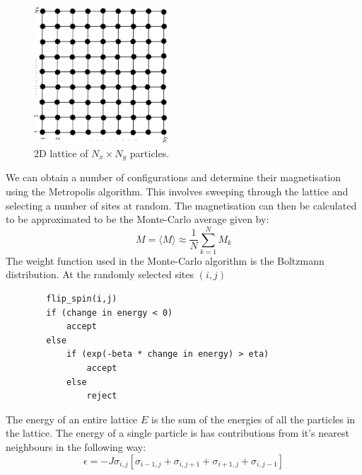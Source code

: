 \documentclass[a4paper]{IEEEtran}
\newcommand{\sg}[2]{\sigma_{#1,#2}}
\newcommand{\av}[1]{\langle #1 \rangle}
\begin{document}
    \begin{figure}[t]
        \caption{2D lattice of $N_x \times N_y$ particles. }
        \label{fig:grid}
        \begin{center}
            \includegraphics[angle=-90,width=5cm]{lattice.eps}
        \end{center}
    \end{figure} 
    
    We can obtain a number of configurations and determine their magnetisation
    using the Metropolis algorithm. This involves sweeping through the lattice
    and selecting a number of sites at random. The magnetisation can then
    be calculated to be approximated to be the Monte-Carlo average given
    by:
    \[ M = \av{M} \approx \frac{1}{N} \sum^{N}_{k=1} M_k \]
    The weight function used in the Monte-Carlo algorithm is the Boltzmann
    distribution.
    At the randomly selected sites $(i,j)$
    \begin{verbatim}
        flip_spin(i,j)
        if (change in energy < 0)
            accept
        else
            if (exp(-beta * change in energy) > eta)
                accept
            else
                reject
    \end{verbatim}
    
    The energy of an entire lattice $E$ is the sum of the energies
    of all the particles in the lattice. The energy of a single particle
    is has contributions from it's nearest neighbours in the following
    way:
    \[ \epsilon = -J \sg{i}{j} \left[ \sg{i-1}{j} +
                                      \sg{i}{j+1} +
                                      \sg{i+1}{j} +
                                      \sg{i}{j-1} \right] \]

\end{document}
